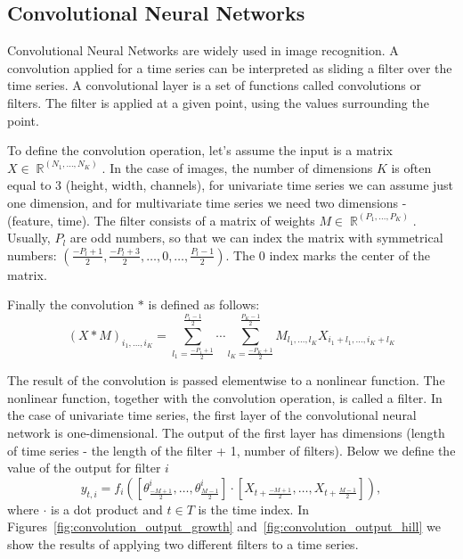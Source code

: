 \documentclass[a4paper,11pt,twoside]{report}
\theoremstyle{definition}
\DeclareMathOperator{\real}{\mathbb{R}}
\begin{document}
\subsection{Convolutional Neural Networks}
Convolutional Neural Networks are widely used in image recognition. A convolution applied for a time series can be interpreted as sliding a filter over the time series. A convolutional layer is a set of functions called convolutions or filters. The filter is applied at a given point, using the values surrounding the point.

To define the convolution operation, let's assume the input is a matrix $X \in \real^{(N_1, \dots, N_K)}$. In the case of images, the number of dimensions $K$ is often equal to $3$ (height, width, channels), for univariate time series we can assume just one dimension, and for multivariate time series we need two dimensions - (feature, time).
The filter consists of a matrix of weights $M \in \real^{(P_1, \dots, P_K)}$.
Usually, $P_l$ are odd numbers, so that we can index the matrix with symmetrical numbers: $ (\frac{-P_l+1}{2},  \frac{-P_l+3}{2}, \dots, 0, \dots, \frac{P_l-1}{2})$. The $0$ index marks the center of the matrix.


Finally the convolution $*$ is defined as follows:
$$(X*M)_{i_1, \dots, i_K} = \sum_{l_1=\frac{-P_1+1}{2}}^{\frac{P_1-1}{2}} \cdots \sum_{l_K=\frac{-P_K+1}{2}}^{\frac{P_K-1}{2}} M_{l_1, \dots, l_K} X_{i_1 + l_1, \dots, i_K + l_K}$$

The result of the convolution is passed elementwise to a nonlinear function. The nonlinear function, together with the convolution operation, is called a filter.
In the case of univariate time series, the first layer of the convolutional neural network is one-dimensional. The output of the first layer has dimensions (length of time series - the length of the filter + 1, number of filters). Below we define the value of the output for filter $i$
$$ y_{t, i} = f_i([\theta_{\frac{-M+1}{2}}^i, \dots , \theta_{\frac{M-1}{2}}^i] \cdot [X_{t+\frac{-M+1}{2}}, \dots, X_{t+\frac{M-1}{2}}]),$$
where $\cdot$ is a dot product and $t \in T$ is the time index.
In Figures~\ref{fig:convolution_output_growth} and~\ref{fig:convolution_output_hill} we show the results of applying two different filters to a time series.


\FloatBarrier
\end{document}
